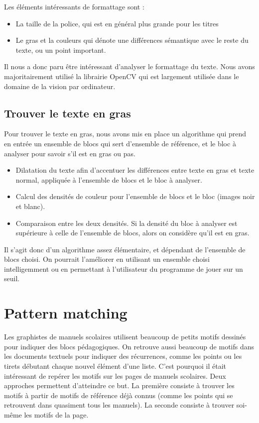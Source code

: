 \documentclass[a4paper, 12pt]{article}
\begin{document}
Les éléments intéressants de formattage sont :
\begin{itemize}
	\item La taille de la police, qui est en général plus grande pour les titres
	\item Le gras et la couleurs qui dénote une différences sémantique avec le reste du texte, ou un point important.
\end{itemize}

Il nous a donc paru être intéressant d'analyser le formattage du texte. Nous avons majoritairement utilisé la librairie OpenCV qui est largement utilisée dans le domaine de la vision par ordinateur.

\smallskip

\subsection{Trouver le texte en gras}
Pour trouver le texte en gras, nous avons mis en place un algorithme qui prend en entrée un ensemble de blocs qui sert d'ensemble de référence, et le bloc à analyser pour savoir s'il est en gras ou pas.
\begin{itemize}
	\item Dilatation du texte afin d'accentuer les différences entre texte en gras et texte normal, appliquée à l'ensemble de blocs et le bloc à analyser.
	\item Calcul des densités de couleur pour l'ensemble de blocs et le bloc (images noir et blanc).
	\item Comparaison entre les deux densités. Si la densité du bloc à analyser est supérieure à celle de l'ensemble de blocs, alors on considère qu'il est en gras.
\end{itemize}
Il s'agit donc d'un algorithme assez élémentaire, et dépendant de l'ensemble de blocs choisi. On pourrait l'améliorer en utilisant un ensemble choisi intelligemment ou en permettant à l'utilisateur du programme de jouer sur un seuil.


\section{Pattern matching}
Les graphistes de manuels scolaires utilisent beaucoup de petits motifs dessinés pour indiquer des blocs pédagogiques. On retrouve aussi beaucoup de motifs dans les documents textuels pour indiquer des récurrences, comme les points ou les tirets débutant chaque nouvel élément d'une liste.
C'est pourquoi il était intéressant de repérer les motifs sur les pages de manuels scolaires. Deux approches permettent d'atteindre ce but. La première consiste à trouver les motifs à partir de motifs de référence déjà connus (comme les points qui se retrouvent dans quasiment tous les manuels). La seconde consiste à trouver soi-même les motifs de la page.
\end{document}

